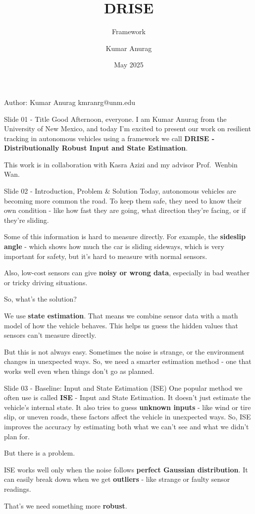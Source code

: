 \documentclass{beamer}
\title{DRISE}
\subtitle{Framework}
\author{Kumar Anurag}
\institute{University of New Mexico}
\date{May 2025}
\begin{document}
\begin{frame}
Author: Kumar Anurag kmranrg@unm.edu
\end{frame}

\begin{frame}{Slide 01 - Title}
\protect\hypertarget{slide-01---title}{}
Good Afternoon, everyone. I am Kumar Anurag from the University of New
Mexico, and today I'm excited to present our work on resilient tracking
in autonomous vehicles using a framework we call \textbf{DRISE -
Distributionally Robust Input and State Estimation}.

This work is in collaboration with Kasra Azizi and my advisor
Prof.~Wenbin Wan.
\end{frame}

\begin{frame}{Slide 02 - Introduction, Problem \& Solution}
\protect\hypertarget{slide-02---introduction-problem-solution}{}
Today, autonomous vehicles are becoming more common the road. To keep
them safe, they need to know their own condition - like how fast they
are going, what direction they're facing, or if they're sliding.

Some of this information is hard to measure directly. For example, the
\textbf{sideslip angle} - which shows how much the car is sliding
sideways, which is very important for safety, but it's hard to measure
with normal sensors.

Also, low-cost sensors can give \textbf{noisy or wrong data}, especially
in bad weather or tricky driving situations.

So, what's the solution?

We use \textbf{state estimation}. That means we combine sensor data with
a math model of how the vehicle behaves. This helps us guess the hidden
values that sensors can't measure directly.

But this is not always easy. Sometimes the noise is strange, or the
environment changes in unexpected ways. So, we need a smarter estimation
method - one that works well even when things don't go as planned.
\end{frame}

\begin{frame}{Slide 03 - Baseline: Input and State Estimation (ISE)}
\protect\hypertarget{slide-03---baseline-input-and-state-estimation-ise}{}
One popular method we often use is called \textbf{ISE} - Input and State
Estimation. It doesn't just estimate the vehicle's internal state. It
also tries to guess \textbf{unknown inputs} - like wind or tire slip, or
uneven roads, these factors affect the vehicle in unexpected ways. So,
ISE improves the accuracy by estimating both what we can't see and what
we didn't plan for.

But there is a problem.

ISE works well only when the noise follows \textbf{perfect Gaussian
distribution}. It can easily break down when we get \textbf{outliers} -
like strange or faulty sensor readings.

That's we need something more \textbf{robust}.
\end{frame}
\end{document}

